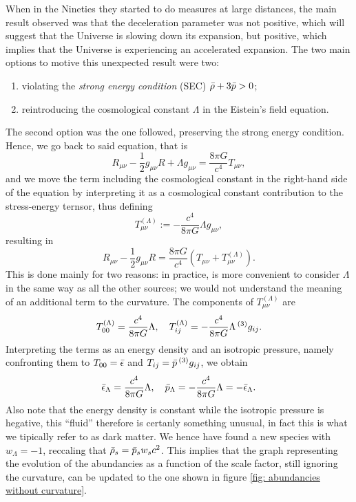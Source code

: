When in the Nineties they started to do measures at large distances, the main result observed was that the deceleration parameter was not positive, which will suggest that the Universe is slowing down its expansion, but positive, which implies that the Universe is experiencing an accelerated expansion. The two main options to motive this unexpected result were two:
\begin{enumerate}
    \item violating the \emph{strong energy condition} (SEC) $\bar{\rho} + 3\bar{p} > 0$;
    \item reintroducing the cosmological constant $\Lambda$ in the Eistein's field equation. 
\end{enumerate} 
The second option was the one followed, preserving the strong energy condition. Hence, we go back to said equation, that is 
\begin{equation}
    R_{\mu\nu} - \frac{1}{2}g_{\mu\nu}R + \Lambda g_{\mu\nu} = \frac{8\pi G}{c^4}T_{\mu\nu},
\end{equation}
and we move the term including the cosmological constant in the right-hand side of the equation by interpreting it as a cosmological constant contribution to the stress-energy ternsor, thus defining 
\begin{equation}
    T^{(\Lambda)}_{\mu\nu} := -\frac{c^4}{8\pi G}\Lambda g_{\mu\nu},
\end{equation}
resulting in 
\begin{equation}
    R_{\mu\nu} - \frac{1}{2}g_{\mu\nu}R = \frac{8\pi G}{c^4}(T_{\mu\nu} + T^{(\Lambda)}_{\mu\nu}). 
\end{equation}
This is done mainly for two reasons: in practice, is more convenient to consider $\Lambda$ in the same way as all the other sources; we would not understand the meaning of an additional term to the curvature. The components of $T_{\mu\nu}^{(\Lambda)}$ are 
\begin{equation}
    T_{00}^{(\Lambda)} = \frac{c^4}{8\pi G}\Lambda,\quad T_{ij}^{(\Lambda)} = -\frac{c^4}{8\pi G}\Lambda\prescript{(3)}{}{g_{ij}}.
\end{equation}
Interpreting the terms as an energy density and an isotropic pressure, namely confronting them to $T_{00} = \bar{\epsilon}$ and $T_{ij} = \bar{p}\prescript{(3)}{}{g_{ij}}$, we obtain 
\begin{equation}
    \bar{\epsilon}_\Lambda = \frac{c^4}{8\pi G}\Lambda,\quad \bar{p}_\Lambda = -\frac{c^4}{8\pi G}\Lambda = -\bar{\epsilon}_\Lambda.
\end{equation}
Also note that the energy density is constant while the isotropic pressure is hegative, this ``fluid'' therefore is certanly something unusual, in fact this is what we tipically refer to as dark matter. We hence have found a new species with $w_\Lambda = -1$, reccaling that $\bar{\rho}_s = \bar{p}_sw_sc^2$. This implies that the graph representing the evolution of the abundancies as a function of the scale factor, still ignoring the curvature, can be updated to the one shown in figure \ref{fig: abundancies without curvature}.
